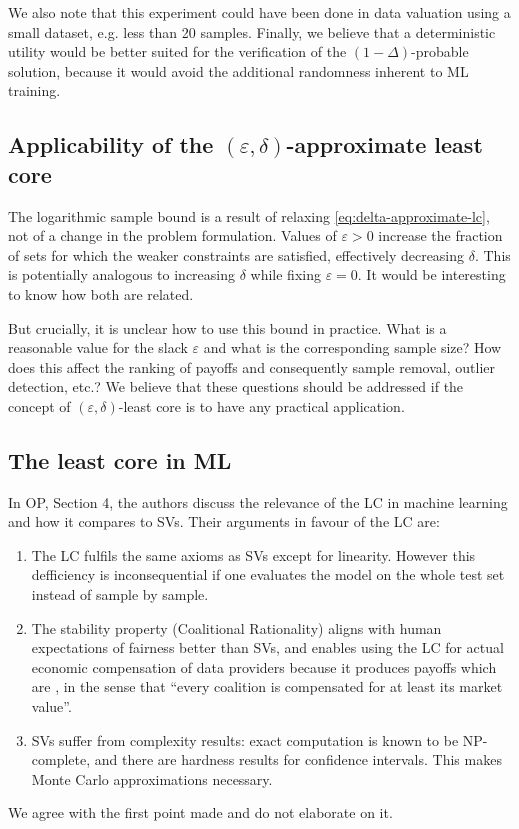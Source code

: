 We also note that this experiment could have been done in data valuation using
a small dataset, e.g. less than 20 samples. Finally, we believe that a
deterministic utility would be better suited for the verification of the $(1 -
\Delta)$-probable solution, because it would avoid the additional randomness
inherent to ML training.

\subsection{Applicability of the $(\varepsilon, \delta)$-approximate least
core}\label{sec:using-eps-delta-lc}

The logarithmic sample bound is a result of relaxing
\eqref{eq:delta-approximate-lc}, not of a change in the problem formulation.
Values of $\varepsilon > 0$ increase the fraction of sets for which the weaker
constraints are satisfied, effectively decreasing $\delta$. This is
potentially analogous to increasing $\delta$ while fixing $\varepsilon = 0$.
It would be interesting to know how both are related.

But crucially, it is unclear how to use this bound in practice. What is a
reasonable value for the slack $\varepsilon$ and what is the corresponding
sample size? How does this affect the ranking of payoffs and consequently
sample removal, outlier detection, etc.? We believe that these questions
should be addressed if the concept of $(\varepsilon, \delta)$-least core is to
have any practical application.

\subsection{The least core in ML}\label{sec:least-core-vs-shapley}

In OP, Section 4, the authors discuss the relevance of the LC in machine
learning and how it compares to SVs. Their arguments in favour of the LC are:
\begin{enumerate}
  \item The LC fulfils the same axioms as SVs except for linearity. However
  this defficiency is inconsequential if one evaluates the model on the whole
  test set instead of sample by sample.
  
  \item The stability property (Coalitional Rationality) aligns with human
  expectations of fairness better than SVs, and enables using the LC for
  actual economic compensation of data providers because it produces payoffs
  which are {}, in the sense that ``every coalition is
  compensated for at least its market value''.
  
  \item SVs suffer from complexity results: exact computation is known to be
  NP-complete, and there are hardness results for confidence intervals. This
  makes Monte Carlo approximations necessary.
\end{enumerate}
We agree with the first point made and do not elaborate on it.

